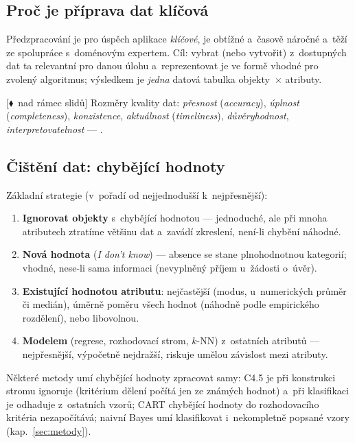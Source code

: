\documentclass[11pt,a4paper]{article}
\theoremstyle{definition}
\newcommand{\mimo}{\textcolor{markcol}{\textsf{\footnotesize[$\blacklozenge$~nad rámec slidů]}}}
\begin{document}
\subsection{Proč je příprava dat klíčová}

Předzpracování je pro úspěch aplikace \emph{klíčové}, je obtížné a~časově náročné a~těží ze
spolupráce s~doménovým expertem. Cíl: vybrat (nebo vytvořit) z~dostupných dat ta relevantní
pro danou úlohu a~reprezentovat je ve formě vhodné pro zvolený algoritmus; výsledkem je
\emph{jedna} datová tabulka objekty~$\times$ atributy.

\mimo{} Rozměry kvality dat: \emph{přesnost} (\emph{accuracy}), \emph{úplnost}
(\emph{completeness}), \emph{konzistence}, \emph{aktuálnost} (\emph{timeliness}),
\emph{důvěryhodnost}, \emph{interpretovatelnost} --- .

\subsection{Čištění dat: chybějící hodnoty}

Základní strategie (v~pořadí od nejjednodušší k~nejpřesnější):

\begin{enumerate}
\item \textbf{Ignorovat objekty} s~chybějící hodnotou --- jednoduché, ale při mnoha atributech
      ztratíme většinu dat a~zavádí zkreslení, není-li chybění náhodné.
\item \textbf{Nová hodnota } (\emph{I don't know}) --- absence se stane
      plnohodnotnou kategorií; vhodné, nese-li sama informaci (nevyplněný příjem u~žádosti
      o~úvěr).
\item \textbf{Existující hodnotou atributu}: nejčastější (modus, u~numerických průměr či
      medián), úměrně poměru všech hodnot (náhodně podle empirického rozdělení), nebo
      libovolnou.
\item \textbf{Modelem} (regrese, rozhodovací strom, $k$-NN) z~ostatních atributů ---
      nejpřesnější, výpočetně nejdražší, riskuje umělou závislost mezi atributy.
\end{enumerate}

Některé metody umí chybějící hodnoty zpracovat samy: C4.5 je při konstrukci stromu ignoruje
(kritérium dělení počítá jen ze známých hodnot) a~při klasifikaci je odhaduje z~ostatních
vzorů; CART chybějící hodnoty do rozhodovacího kritéria nezapočítává; naivní Bayes umí
klasifikovat i~nekompletně popsané vzory (kap.~\ref{sec:metody}).
\end{document}
